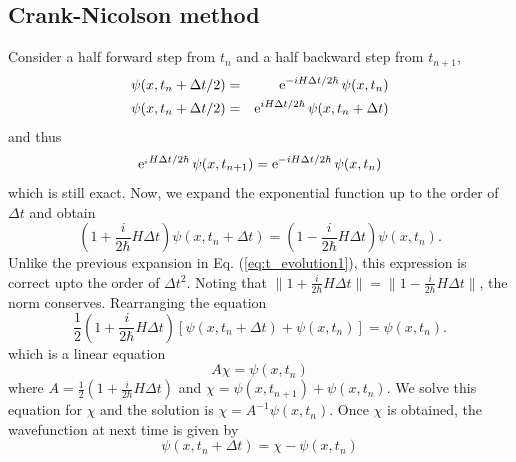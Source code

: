 \subsection{Crank-Nicolson method}

Consider a half forward step from $t_n$ and a half backward step from $t_{n+1}$,
\begin{eqnarray}
\psi(x,t_{n}+\Delta t/2) &=& \text{e}^{-i H \Delta t/2\hbar}\, \psi(x,t_n) \\
\psi(x,t_{n}+\Delta t/2) &=& \text{e}^{ i H \Delta t/2\hbar}\, \psi(x,t_n+\Delta t)
\end{eqnarray}
and thus
\begin{equation}
\text{e}^{_i H \Delta t/2\hbar}\, \psi(x,t_{n+1}) = \text{e}^{-i H \Delta t/2\hbar}\, \psi(x,t_n)
\end{equation}
which is still exact.  Now, we expand the exponential function up to the order of $\Delta t$ and obtain
\begin{equation}
\left (1 + \frac{i}{2\hbar} H \Delta t \right ) \psi(x,t_n+\Delta t) = \left (1 - \frac{i}{2\hbar} H \Delta t \right ) \psi(x,t_n).
\end{equation}
Unlike the previous expansion in Eq. (\ref{eq:t_evolution1}), this expression is correct upto the order of $\Delta t^2$.
Noting that $\|1 + \frac{i}{2\hbar} H \Delta t\| = \|1 - \frac{i}{2\hbar} H \Delta t\|$, the norm conserves.  Rearranging the equation
\begin{equation}
\frac{1}{2}\left (1 + \frac{i}{2\hbar} H \Delta t \right ) [\psi(x,t_n+\Delta t)+\psi(x,t_n)] = \psi(x,t_n).
\end{equation}
which is a linear equation
\begin{equation}\label{eq:chi}
A \chi = \psi(x,t_n)
\end{equation}
where $A = \frac{1}{2} \left (1 + \frac{i}{2\hbar} H \Delta t \right )$ and $\chi = \psi(x,t_{n+1}) + \psi(x,t_n)$. We solve this equation for $\chi$ and the solution is $\chi=A^{-1} \psi(x,t_n)$.  Once $\chi$ is obtained, the wavefunction at next time is given by
\begin{equation}
\psi(x,t_n+\Delta t) = \chi - \psi(x,t_n)
\end{equation}

